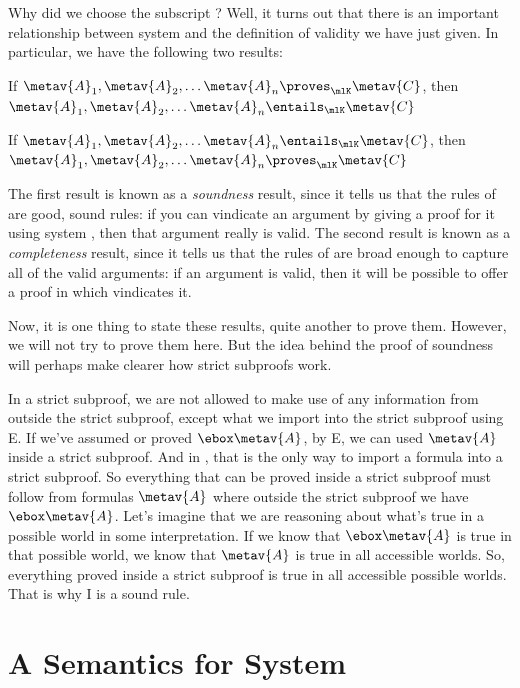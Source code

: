 Why did we choose the subscript \mlK? Well, it turns out that there is an important relationship between system \mlK{} and the definition of validity we have just given. In particular, we have the following two results:
\begin{compactlist}
	\item If $\metav{A}_1,\metav{A}_2, \dots \metav{A}_n\proves_\mlK\metav{C}$, then $\metav{A}_1,\metav{A}_2, \dots \metav{A}_n\entails_\mlK\metav{C}$
	\item If $\metav{A}_1,\metav{A}_2, \dots \metav{A}_n\entails_\mlK\metav{C}$, then $\metav{A}_1,\metav{A}_2, \dots \metav{A}_n\proves_\mlK\metav{C}$
\end{compactlist}
The first result is known as a \emph{soundness} result, since it tells us that the rules of \mlK{} are good, sound rules: if you can vindicate an argument by giving a proof for it using system \mlK, then that argument really is valid. The second result is known as a \emph{completeness} result, since it tells us that the rules of \mlK{} are broad enough to capture all of the valid arguments: if an argument is valid, then it will be possible to offer a proof in \mlK{} which vindicates it.

Now, it is one thing to state these results, quite another to prove them. However, we will not try to prove them here. But the idea behind the proof of soundness will perhaps make clearer how strict subproofs work.

In a strict subproof, we are not allowed to make use of any information from outside the strict subproof, except what we import into the strict subproof using \ebox E. If we've assumed or proved $\ebox \metav{A}$, by \ebox E, we can used $\metav{A}$ inside a strict subproof. And in \mlK, that is the only way to import a formula into a strict subproof. So everything that can be proved inside a strict subproof must follow from formulas $\metav{A}$ where outside the strict subproof we have $\ebox \metav{A}$. Let's imagine that we are reasoning about what's true in a possible world in some interpretation. If we know that $\ebox\metav{A}$ is true in that possible world, we know that $\metav{A}$ is true in all accessible worlds. So, everything proved inside a strict subproof is true in all accessible possible worlds. That is why \ebox I is a sound rule.

\section{A Semantics for System \mlT}
\label{SemanticsT}

